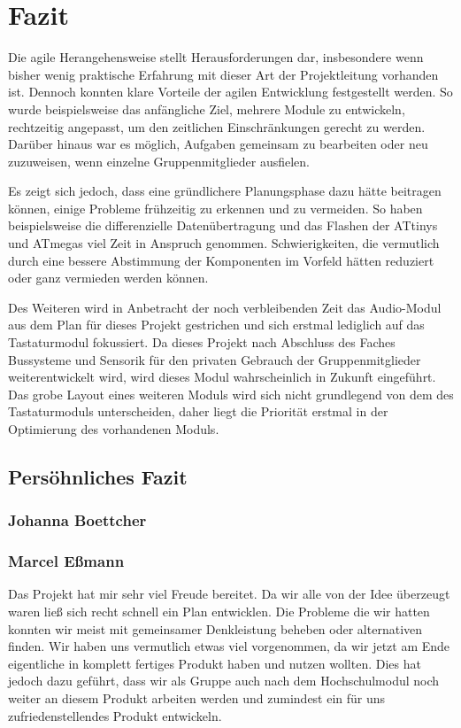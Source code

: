 \section{Fazit}
Die agile Herangehensweise stellt  Herausforderungen dar, insbesondere wenn bisher wenig praktische Erfahrung mit dieser Art der Projektleitung vorhanden ist. Dennoch konnten klare Vorteile der agilen Entwicklung festgestellt werden. So wurde beispielsweise das anfängliche Ziel, mehrere Module zu entwickeln, rechtzeitig angepasst, um den zeitlichen Einschränkungen gerecht zu werden. Darüber hinaus war es möglich, Aufgaben gemeinsam zu bearbeiten oder neu zuzuweisen, wenn einzelne Gruppenmitglieder ausfielen.

Es zeigt sich jedoch, dass eine gründlichere Planungsphase dazu hätte beitragen können, einige Probleme frühzeitig zu erkennen und zu vermeiden. So haben beispielsweise die differenzielle Datenübertragung und das Flashen der ATtinys und ATmegas viel Zeit in Anspruch genommen. Schwierigkeiten, die vermutlich durch eine bessere Abstimmung der Komponenten im Vorfeld hätten reduziert oder ganz vermieden werden können.

Des Weiteren wird in Anbetracht der noch verbleibenden Zeit das Audio-Modul aus dem Plan für dieses Projekt gestrichen und sich erstmal lediglich auf das Tastaturmodul fokussiert. Da dieses Projekt nach Abschluss des Faches \glqq Bussysteme und Sensorik\grqq{} für den privaten Gebrauch der Gruppenmitglieder weiterentwickelt wird, wird dieses Modul wahrscheinlich in Zukunft eingeführt. Das grobe Layout eines weiteren Moduls wird sich nicht grundlegend von dem des Tastaturmoduls unterscheiden, daher liegt die Priorität erstmal in der Optimierung des vorhandenen Moduls.


\subsection{Persöhnliches Fazit}
\subsubsection{Johanna Boettcher}

\subsubsection{Marcel Eßmann}
Das Projekt hat mir sehr viel Freude bereitet. Da wir alle von der Idee überzeugt waren ließ sich recht schnell ein Plan entwicklen. Die Probleme die wir hatten konnten wir meist mit gemeinsamer Denkleistung beheben oder alternativen finden.
Wir haben uns vermutlich etwas viel vorgenommen, da wir jetzt am Ende eigentliche in komplett fertiges Produkt haben und nutzen wollten. Dies hat jedoch dazu geführt, dass wir als Gruppe auch nach dem Hochschulmodul noch weiter an diesem Produkt arbeiten werden und zumindest ein für uns zufriedenstellendes Produkt entwickeln. 

